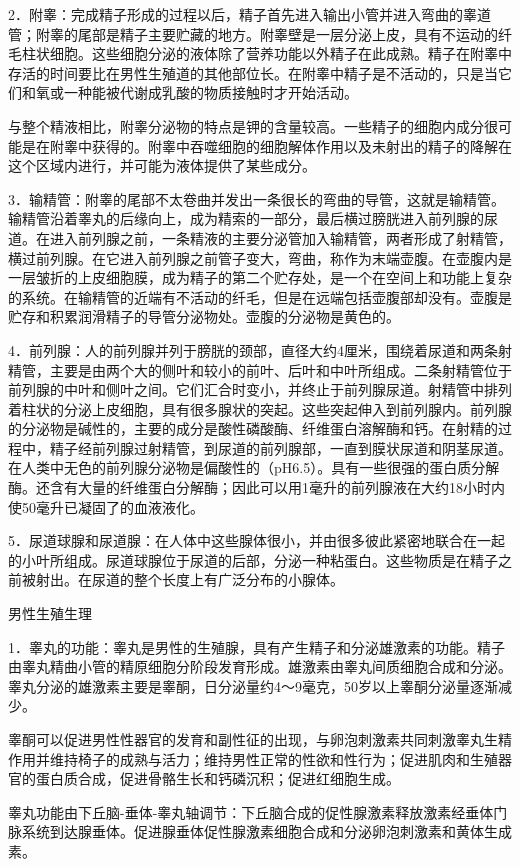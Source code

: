 \documentclass[12pt,UTF8,openany]{ctexbook}
\begin{document}
2．附睾：完成精子形成的过程以后，精子首先进入输出小管并进入弯曲的睾道管；附睾的尾部是精子主要贮藏的地方。附睾壁是一层分泌上皮，具有不运动的纤毛柱状细胞。这些细胞分泌的液体除了营养功能以外精子在此成熟。精子在附睾中存活的时间要比在男性生殖道的其他部位长。在附睾中精子是不活动的，只是当它们和氧或一种能被代谢成乳酸的物质接触时才开始活动。

与整个精液相比，附睾分泌物的特点是钾的含量较高。一些精子的细胞内成分很可能是在附睾中获得的。附睾中吞噬细胞的细胞解体作用以及未射出的精子的降解在这个区域内进行，并可能为液体提供了某些成分。

3．输精管：附睾的尾部不太卷曲并发出一条很长的弯曲的导管，这就是输精管。输精管沿着睾丸的后缘向上，成为精索的一部分，最后横过膀胱进入前列腺的尿道。在进入前列腺之前，一条精液的主要分泌管加入输精管，两者形成了射精管，横过前列腺。在它进入前列腺之前管子变大，弯曲，称作为末端壶腹。在壶腹内是一层皱折的上皮细胞膜，成为精子的第二个贮存处，是一个在空间上和功能上复杂的系统。在输精管的近端有不活动的纤毛，但是在远端包括壶腹部却没有。壶腹是贮存和积累润滑精子的导管分泌物处。壶腹的分泌物是黄色的。

4．前列腺：人的前列腺并列于膀胱的颈部，直径大约4厘米，围绕着尿道和两条射精管，主要是由两个大的侧叶和较小的前叶、后叶和中叶所组成。二条射精管位于前列腺的中叶和侧叶之间。它们汇合时变小，并终止于前列腺尿道。射精管中排列着柱状的分泌上皮细胞，具有很多腺状的突起。这些突起伸入到前列腺内。前列腺的分泌物是碱性的，主要的成分是酸性磷酸酶、纤维蛋白溶解酶和钙。在射精的过程中，精子经前列腺过射精管，到尿道的前列腺部，一直到膜状尿道和阴茎尿道。在人类中无色的前列腺分泌物是偏酸性的（pH6.5）。具有一些很强的蛋白质分解酶。还含有大量的纤维蛋白分解酶；因此可以用1毫升的前列腺液在大约18小时内使50毫升已凝固了的血液液化。

5．尿道球腺和尿道腺：在人体中这些腺体很小，并由很多彼此紧密地联合在一起的小叶所组成。尿道球腺位于尿道的后部，分泌一种粘蛋白。这些物质是在精子之前被射出。在尿道的整个长度上有广泛分布的小腺体。

男性生殖生理

1．睾丸的功能：睾丸是男性的生殖腺，具有产生精子和分泌雄激素的功能。精子由睾丸精曲小管的精原细胞分阶段发育形成。雄激素由睾丸间质细胞合成和分泌。睾丸分泌的雄激素主要是睾酮，日分泌量约4～9毫克，50岁以上睾酮分泌量逐渐减少。

睾酮可以促进男性性器官的发育和副性征的出现，与卵泡刺激素共同刺激睾丸生精作用并维持椅子的成熟与活力；维持男性正常的性欲和性行为；促进肌肉和生殖器官的蛋白质合成，促进骨骼生长和钙磷沉积；促进红细胞生成。

睾丸功能由下丘脑-垂体-睾丸轴调节：下丘脑合成的促性腺激素释放激素经垂体门脉系统到达腺垂体。促进腺垂体促性腺激素细胞合成和分泌卵泡刺激素和黄体生成素。
\end{document}
